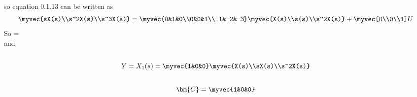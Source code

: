 \begin{enumerate}[label=\thesection.\arabic*.,ref=\thesection.\theenumi]
so equation 0.1.13 can be written as
\begin{align}
\myvec{sX(s)\\s^2X(s)\\s^3X(s)}
=
\myvec{0&1&0\\0&0&1\\-1&-2&-3}\myvec{X(s)\\s(s)\\s^2X(s)}
+
\myvec{0\\0\\1}  U
\end{align}
So =
\\ and 
\begin{align}
    \\Y=X_{1}(s)=
\myvec{1&0&0} \myvec{X(s)\\sX(s)\\s^2X(s)}
\end{align}
\begin{align}
\\\bm{C}=
\myvec{1&0&0}
\end{align}
\end{enumerate}
